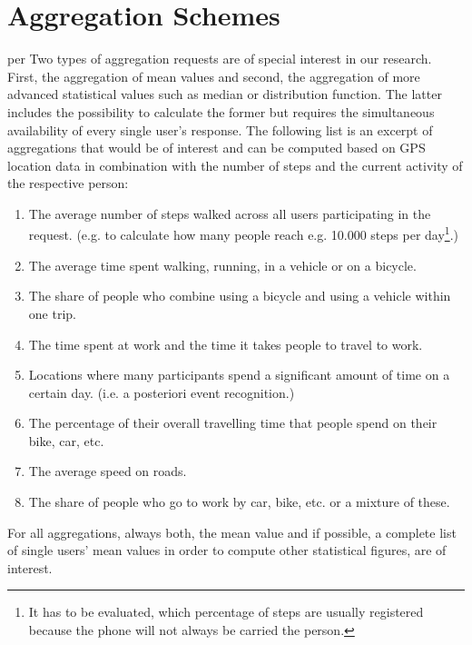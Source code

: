  \section{Aggregation Schemes}\label{aggregation-schemes}per
 Two types of aggregation requests are of special interest in our research. First, the aggregation of mean values and second, the aggregation of more advanced statistical values such as median or distribution function. The latter includes the possibility to calculate the former but requires the simultaneous availability of every single user's response. 
 The following list is an excerpt of aggregations that would be of interest and can be computed based on GPS location data in combination with the number of steps and the current activity of the respective person:
 \begin{enumerate}
 	\item The average number of steps walked across all users participating in the request. (e.g. to calculate how many people reach e.g. 10.000 steps per day\footnote{It has to be evaluated, which percentage of steps are usually registered because the phone will not always be carried the person.}.)
	\item The average time spent walking, running, in a vehicle or on a bicycle.
	\item The share of people who combine using a bicycle and using a vehicle within one trip.
	\item The time spent at work and the time it takes people to travel to work.
	\item Locations where many participants spend a significant amount of time on a certain day. (i.e. a posteriori event recognition.)
	\item The percentage of their overall travelling time that people spend on their bike, car, etc.
	\item The average speed on roads.
	\item The share of people who go to work by car, bike, etc. or a mixture of these.
 \end{enumerate}
 For all aggregations, always both, the mean value and if possible, a complete list of single users' mean values in order to compute other statistical figures, are of interest.

